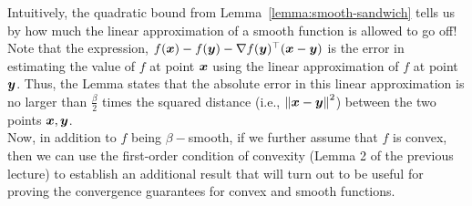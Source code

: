 \documentclass{article}
\begin{document}
\noindent Intuitively, the quadratic bound from Lemma~\ref{lemma:smooth-sandwich} tells us by how much the linear approximation of a smooth function is allowed to go off!
Note that the expression, $f({\bm{x}}) - f({\bm{y}}) - \nabla f({\bm{y}})^\top ({\bm{x}}-{\bm{y}})$ is the error in estimating the value of $f$ at point ${\bm{x}}$ using the linear approximation of $f$ at point ${\bm{y}}$.
Thus, the Lemma states that the absolute error in this linear approximation is no larger than $\frac{\beta}{2}$ times the squared distance (i.e., $\left\|{\bm{x}}-{\bm{y}}\right\|^2$) between the two points ${\bm{x}}, {\bm{y}}$.\\[5pt]
\noindent Now, in addition to $f$ being $\beta-$smooth, if we further assume that $f$ is convex, then we can use the first-order condition of convexity (Lemma 2 of the previous lecture) to establish an additional result that will turn out to be useful for proving the convergence guarantees for convex and smooth functions.
\end{document}
